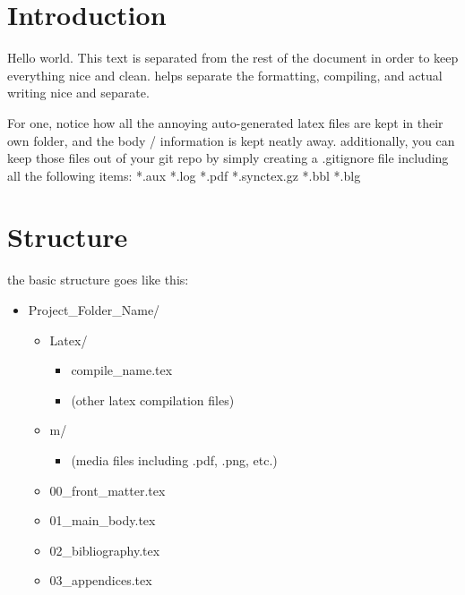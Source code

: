 \section{Introduction}

Hello world. This text is separated from the rest of the document in order to keep everything nice and clean. helps separate the formatting, compiling, and actual writing nice and separate. 

For one, notice how all the annoying auto-generated latex files are kept in their own folder, and the body / information is kept neatly away. additionally, you can keep those files out of your git repo by simply creating a .gitignore file including all the following items:
\newline \newline
*.aux \newline
*.log \newline
*.pdf \newline
*.synctex.gz \newline
*.bbl \newline
*.blg \newline


\section{Structure}
the basic structure goes like this:
\begin{itemize} 
    \item Project\_Folder\_Name/
    \begin{itemize} 
        \item Latex/
        \begin{itemize} 
            \item compile\_name.tex
            \item (other latex compilation files)
        \end{itemize}
        \item m/
        \begin{itemize} 
            \item (media files including .pdf, .png, etc.)
        \end{itemize}
        \item 00\_front\_matter.tex
        \item 01\_main\_body.tex
        \item 02\_bibliography.tex
        \item 03\_appendices.tex
    \end{itemize}
\end{itemize} %